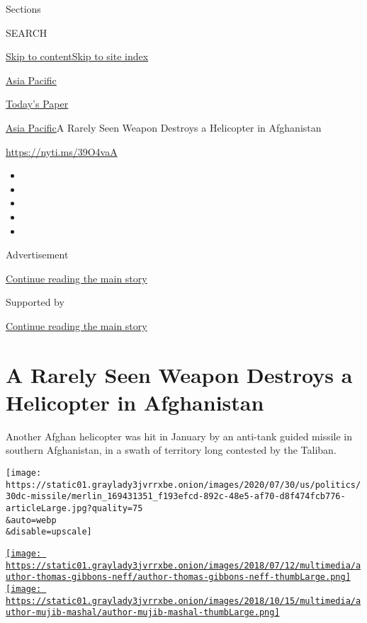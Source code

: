 Sections

SEARCH

\protect\hyperlink{site-content}{Skip to
content}\protect\hyperlink{site-index}{Skip to site index}

\href{https://www.nytimes3xbfgragh.onion/section/world/asia}{Asia
Pacific}

\href{https://myaccount.nytimes3xbfgragh.onion/auth/login?response_type=cookie\&client_id=vi}{}

\href{https://www.nytimes3xbfgragh.onion/section/todayspaper}{Today's
Paper}

\href{/section/world/asia}{Asia Pacific}\textbar{}A Rarely Seen Weapon
Destroys a Helicopter in Afghanistan

\url{https://nyti.ms/39O4vaA}

\begin{itemize}
\item
\item
\item
\item
\item
\end{itemize}

Advertisement

\protect\hyperlink{after-top}{Continue reading the main story}

Supported by

\protect\hyperlink{after-sponsor}{Continue reading the main story}

\hypertarget{a-rarely-seen-weapon-destroys-a-helicopter-in-afghanistan}{%
\section{A Rarely Seen Weapon Destroys a Helicopter in
Afghanistan}\label{a-rarely-seen-weapon-destroys-a-helicopter-in-afghanistan}}

Another Afghan helicopter was hit in January by an anti-tank guided
missile in southern Afghanistan, in a swath of territory long contested
by the Taliban.

\texttt{[image: https://static01.graylady3jvrrxbe.onion/images/2020/07/30/us/politics/30dc-missile/merlin\_169431351\_f193efcd-892c-48e5-af70-d8f474fcb776-articleLarge.jpg?quality=75\\\&auto=webp\\\&disable=upscale]}

\href{https://www.nytimes3xbfgragh.onion/by/thomas-gibbons-neff}{\texttt{[image: https://static01.graylady3jvrrxbe.onion/images/2018/07/12/multimedia/author-thomas-gibbons-neff/author-thomas-gibbons-neff-thumbLarge.png]}}\href{https://www.nytimes3xbfgragh.onion/by/mujib-mashal}{\texttt{[image: https://static01.graylady3jvrrxbe.onion/images/2018/10/15/multimedia/author-mujib-mashal/author-mujib-mashal-thumbLarge.png]}}

